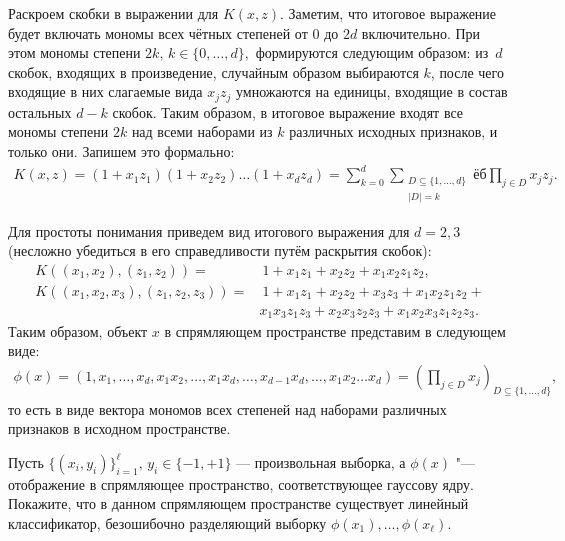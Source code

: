 \documentclass[12pt,fleqn]{article}
\begin{document}
\begin{esSolution}
	Раскроем скобки в выражении для $K(x, z).$ Заметим, что итоговое выражение будет включать мономы всех чётных степеней от 0 до $2d$ включительно. При этом мономы степени $2k, \, k \in \{ 0, \dots, d\},$ формируются следующим образом: из~$d$ скобок, входящих в произведение, случайным образом выбираются $k$, после чего входящие в них слагаемые вида $x_j z_j$ умножаются на единицы, входящие в состав остальных $d-k$ скобок. Таким образом, в итоговое выражение входят все мономы степени $2k$ над всеми наборами из $k$ различных исходных признаков, и только они. Запишем это формально:
	\begin{align*}
		K(x, z) = (1+x_1 z_1) (1 + x_2 z_2) \dots (1 + x_d z_d)	=
		\sum_{k=0}^d \sum_{\substack{D \subseteq \{1, \dots, d\} \\ |D| = k}} ёб \prod_{j \in D} x_j z_j.
	\end{align*}
	
	Для простоты понимания приведем вид итогового выражения для $d = 2, 3$ (несложно убедиться в его справедливости путём раскрытия скобок):
	\begin{align*}
		K((x_1, x_2), (z_1, z_2)) =&\ 1 + x_1 z_1 + x_2 z_2 + x_1 x_2 z_1 z_2, \\
		K((x_1, x_2, x_3), (z_1, z_2, z_3)) =&\ 1 + x_1 z_1 + x_2 z_2 + x_3 z_3 + x_1 x_2 z_1 z_2 + \\
		&x_1 x_3 z_1 z_3 + x_2 x_3 z_2 z_3 + x_1 x_2 x_3 z_1 z_2 z_3.			
	\end{align*}
	Таким образом, объект $x$ в спрямляющем пространстве представим в следующем виде:
	\begin{align*}
		\phi(x) = \left( 1, x_1, \dots, x_d, x_1 x_2, \dots, x_1 x_d, \dots , x_{d-1} x_d, \dots, x_1 x_2 \dots x_d\right) =
		\left( \prod_{j \in D} x_j \right)_{D \subseteq \{1, \dots, d\}},
	\end{align*}
	то есть в виде вектора мономов всех степеней над наборами различных признаков в исходном пространстве.
\end{esSolution}
\newpage
\begin{vkProblem}
	\label{pr:gauss}
	Пусть $ \{(x_i, y_i)\}_{i=1}^\ell, \, y_i \in \{-1, +1\}$ — произвольная выборка, а $\phi(x)$ "--- отображение в спрямляющее пространство, соответствующее гауссову ядру. Покажите, что в данном спрямляющем пространстве существует линейный классификатор, безошибочно разделяющий выборку $\phi(x_1), \dots, \phi(x_\ell).$
\end{vkProblem}
\end{document}
